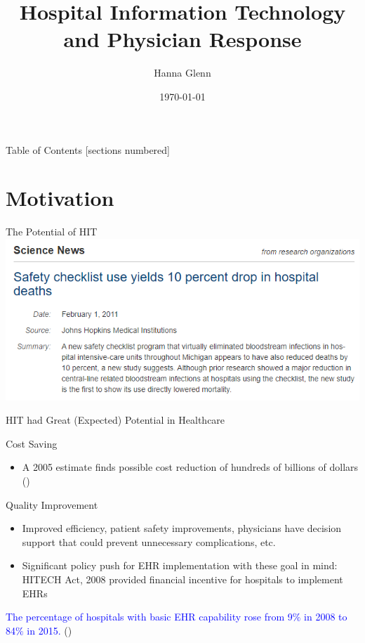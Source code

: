 \documentclass[10pt]{beamer}
\title{Hospital Information Technology and Physician Response}
\subtitle{Hanna Glenn}
\date{\today}
\begin{document}
\maketitle


\begin{frame}{Table of Contents}
  [sections numbered]
  \tableofcontents%
\end{frame}

\section[Motivation]{Motivation}

\begin{frame}{The Potential of HIT}
\centering
    \includegraphics[scale=.6]{graphics/News Clip4.PNG}
\end{frame}

\begin{frame}[fragile]{HIT had Great (Expected) Potential in Healthcare}
\begin{alertblock}{Cost Saving}
\begin{itemize}
    \item A 2005 estimate finds possible cost reduction of hundreds of billions of dollars (\cite{hillestad2005})
\end{itemize}
\end{alertblock}

\begin{alertblock}{Quality Improvement}
\begin{itemize}
    \item Improved efficiency, patient safety improvements, physicians have decision support that could prevent unnecessary complications, etc.
    \item Significant policy push for EHR implementation with these goal in mind: HITECH Act, 2008 provided financial incentive for hospitals to implement EHRs \nocite{hitech}
\end{itemize}
\end{alertblock}

\textcolor{blue}{The percentage of hospitals with basic EHR capability rose from 9$\%$ in 2008 to 84$\%$ in 2015.} (\cite{stats})

\end{frame}
\end{document}
